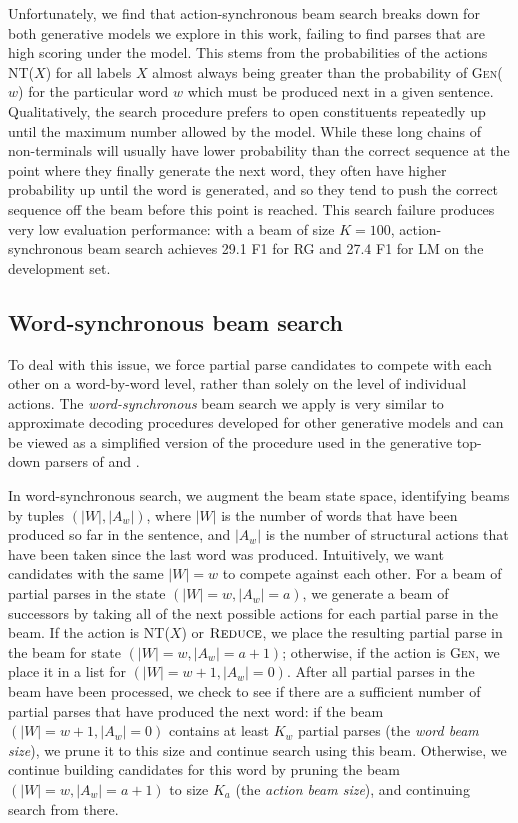 \documentclass[11pt,a4paper]{article}
\begin{document}
Unfortunately, we find that action-synchronous beam search breaks down for both generative models we explore in this work, failing to find parses that are high scoring under the model. This stems from the probabilities of the actions \textsc{NT($X$)} for all labels $X$ almost always being greater than the probability of \textsc{Gen($w$)} for the particular word $w$ which must be produced next in a given sentence. Qualitatively, the search procedure prefers to open constituents repeatedly up until the maximum number allowed by the model. 
While these long chains of non-terminals will usually have lower probability than the correct sequence at the point where they finally generate the next word, they often have higher probability up until the word is generated, and so they tend to push the correct sequence off the beam before this point is reached.
This search failure produces very low evaluation performance: with a beam of size $K = 100$, action-synchronous beam search achieves 29.1 F1 for RG and 27.4 F1 for LM on the development set.

\subsection{Word-synchronous beam search}
\label{sec:word-level-beam}
To deal with this issue, we force partial parse candidates to compete with each other on a word-by-word level, rather than solely on the level of individual actions. The \emph{word-synchronous} beam search we apply 
is very similar to approximate decoding procedures developed for other generative models \cite{henderson2003inducing,titov2010latent,buys2015generative} and can be viewed as a simplified version of the procedure used in the generative top-down parsers of \citet{roark2001probabilistic} and \citet{charniak2010top}.

In word-synchronous search, we augment the beam state space, identifying beams by tuples $(|W|, |A_w|)$, where $|W|$ is the number of words that have been produced so far in the sentence, and $|A_w|$ is the number of structural actions that have been taken since the last word was produced. Intuitively, we want candidates with the same $|W|=w$ to compete against each other. For a beam of partial parses in the state $(|W|=w, |A_w|=a)$, we generate a beam of successors by taking all of the next possible actions for each partial parse in the beam. If the action is \textsc{NT}($X$) or $\textsc{Reduce}$, we place the resulting partial parse in the beam for state $(|W|=w, |A_w|=a+1)$; otherwise, if the action is  \textsc{Gen}, we place it in a list for $(|W|=w+1, |A_w|=0)$. After all partial parses in the beam have been processed, we check to see if there are a sufficient number of partial parses that have produced the next word: if the beam $(|W|=w+1, |A_w|=0)$ contains at least $K_w$ partial parses (the \emph{word beam size}), we prune it to this size and continue search using this beam. Otherwise, we continue building candidates for this word by pruning the beam $(|W|=w, |A_w|=a+1)$ to size $K_a$ (the \emph{action beam size}), and continuing search from there.
\end{document}
